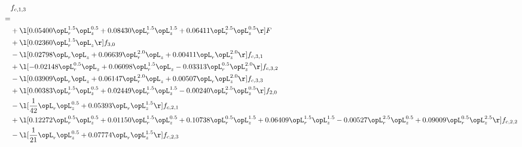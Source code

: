 \begin{alignat}{2} 
\label{eq:f_13_2} 
& f_{c,1,3} \nonumber \\ 
 = \\ 
& + \l[  0.05400 \opL_r^{1.5} \opL_z^{0.5} +  0.08430 \opL_r^{1.5} \opL_z^{1.5} +  0.06411 \opL_r^{2.5} \opL_z^{0.5}  \r] F \nonumber \\ 
& + \l[  0.02360 \opL_r^{1.5} \opL_z  \r] f_{3,0} \nonumber \\ 
& - \l[  0.02798 \opL_r \opL_z +  0.06639 \opL_r^{2.0} \opL_z +  0.00411 \opL_r \opL_z^{2.0}  \r] f_{c,3,1} \nonumber \\ 
& + \l[  -0.02148 \opL_r^{0.5} \opL_z +  0.06098 \opL_r^{1.5} \opL_z   -0.03313 \opL_r^{0.5} \opL_z^{2.0}  \r] f_{c,3,2} \nonumber \\ 
& - \l[  0.03909 \opL_r \opL_z +  0.06147 \opL_r^{2.0} \opL_z +  0.00507 \opL_r \opL_z^{2.0}  \r] f_{c,3,3} \nonumber \\ 
& + \l[  0.00383 \opL_r^{1.5} \opL_z^{0.5} +  0.02449 \opL_r^{1.5} \opL_z^{1.5}   -0.00240 \opL_r^{2.5} \opL_z^{0.5}  \r] f_{2,0} \nonumber \\ 
& - \l[ \frac{1}{42} \opL_r \opL_z^{0.5} +  0.05393 \opL_r \opL_z^{1.5}  \r] f_{c,2,1} \nonumber \\ 
& + \l[  0.12272 \opL_r^{0.5} \opL_z^{0.5} +  0.01150 \opL_r^{1.5} \opL_z^{0.5} +  0.10738 \opL_r^{0.5} \opL_z^{1.5} +  0.06409 \opL_r^{1.5} \opL_z^{1.5}   -0.00527 \opL_r^{2.5} \opL_z^{0.5} +  0.09009 \opL_r^{0.5} \opL_z^{2.5}  \r] f_{c,2,2} \nonumber \\ 
& - \l[ \frac{1}{21} \opL_r \opL_z^{0.5} +  0.07774 \opL_r \opL_z^{1.5}  \r] f_{c,2,3} \nonumber \\ 
\end{alignat} 


